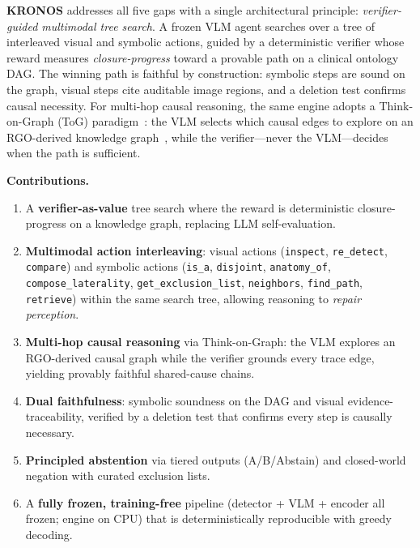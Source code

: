 \documentclass[runningheads]{llncs}
\begin{document}
\textbf{KRONOS} addresses all five gaps with a single architectural
principle: \emph{verifier-guided multimodal tree search}.
A frozen VLM agent searches over a tree of interleaved visual and symbolic
actions, guided by a deterministic verifier whose reward measures
\emph{closure-progress} toward a provable path on a clinical ontology DAG.
The winning path is faithful by construction: symbolic steps are sound on
the graph, visual steps cite auditable image regions, and a deletion test
confirms causal necessity.
For multi-hop causal reasoning, the same engine adopts a Think-on-Graph
(ToG) paradigm~\cite{sun2024thinkongraph}: the VLM selects which causal
edges to explore on an RGO-derived knowledge graph~\cite{budovec2014rgo},
while the verifier---never the VLM---decides when the path is sufficient.

\noindent\textbf{Contributions.}
\begin{enumerate}
  \item A \textbf{verifier-as-value} tree search where the reward is
    deterministic closure-progress on a knowledge graph, replacing LLM
    self-evaluation.
  \item \textbf{Multimodal action interleaving}: visual actions
    (\texttt{inspect}, \texttt{re\_detect}, \texttt{compare}) and symbolic
    actions (\texttt{is\_a}, \texttt{disjoint}, \texttt{anatomy\_of},
    \texttt{compose\_laterality}, \texttt{get\_exclusion\_list},
    \texttt{neighbors}, \texttt{find\_path}, \texttt{retrieve}) within the
    same search tree, allowing reasoning to \emph{repair perception}.
  \item \textbf{Multi-hop causal reasoning} via Think-on-Graph: the VLM
    explores an RGO-derived causal graph while the verifier grounds every
    trace edge, yielding provably faithful shared-cause chains.
  \item \textbf{Dual faithfulness}: symbolic soundness on the DAG
    and visual evidence-traceability, verified by a deletion test that
    confirms every step is causally necessary.
  \item \textbf{Principled abstention} via tiered outputs (A/B/Abstain)
    and closed-world negation with curated exclusion lists.
  \item A \textbf{fully frozen, training-free} pipeline (detector + VLM +
    encoder all frozen; engine on CPU) that is deterministically reproducible
    with greedy decoding.
\end{enumerate}

\end{document}
